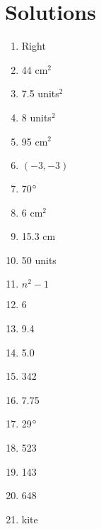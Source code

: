 \documentclass[../uilmath.tex]{subfiles}
\begin{document}
\section*{Solutions}
\begin{enumerate}[label=\bfseries\arabic*.]
    \item %
    Right 

    \item %
    44 cm$^2$

    \item %
    7.5 units$^2$

    \item %
    8 units$^2$

    \item %
    95 cm$^2$

    \item %
    $(-3,-3)$

    \item %
    70$\degree$

    \item %
    6 cm$^2$

    \item %
    15.3 cm 

    \item %
    50 units 

    \item %
    $n^2-1$

    \item %
    6

    \item %
    9.4

    \item %
    5.0

    \item %
    342

    \item %
    7.75 

    \item %
    29$\degree$

    \item %
    523

    \item %
    143

    \item %
    648

    \item %
    kite 


\end{enumerate}
\end{document}
